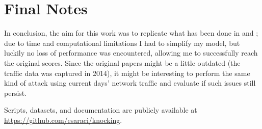  \section{Final Notes}
 In conclusion, the aim for this work was to replicate what has been done in \cite{contiknocking} and \cite{contianalysis}; due to time and computational limitations I had to simplify my model, but luckily no loss of performance was encountered, allowing me to successfully reach the original scores. Since the original papers might be a little outdated (the traffic data was captured in 2014), it might be interesting to perform the same kind of attack using current days' network traffic and evaluate if such issues still persist.
 

 Scripts, datasets, and documentation are publicly available at \url{https://github.com/esaraci/knocking}.
